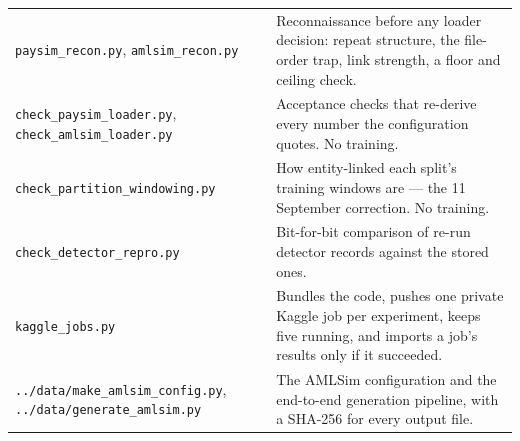 \documentclass[11pt]{article}
\begin{document}
\begin{center}
\begin{tabularx}{\linewidth}{@{}p{5.2cm} X@{}}
\texttt{paysim\_recon.py}, \texttt{amlsim\_recon.py} & Reconnaissance before any loader decision: repeat structure, the file-order trap, link strength, a floor and ceiling check. \\
\texttt{check\_paysim\_loader.py}, \texttt{check\_amlsim\_loader.py} & Acceptance checks that re-derive every number the configuration quotes. No training. \\
\texttt{check\_partition\_windowing.py} & How entity-linked each split's training windows are --- the 11 September correction. No training. \\
\texttt{check\_detector\_repro.py} & Bit-for-bit comparison of re-run detector records against the stored ones. \\
\texttt{kaggle\_jobs.py} & Bundles the code, pushes one private Kaggle job per experiment, keeps five running, and imports a job's results only if it succeeded. \\
\texttt{../data/make\_amlsim\_config.py}, \texttt{../data/generate\_amlsim.py} & The AMLSim configuration and the end-to-end generation pipeline, with a SHA-256 for every output file. \\
\bottomrule
\end{tabularx}
\end{center}
\end{document}
